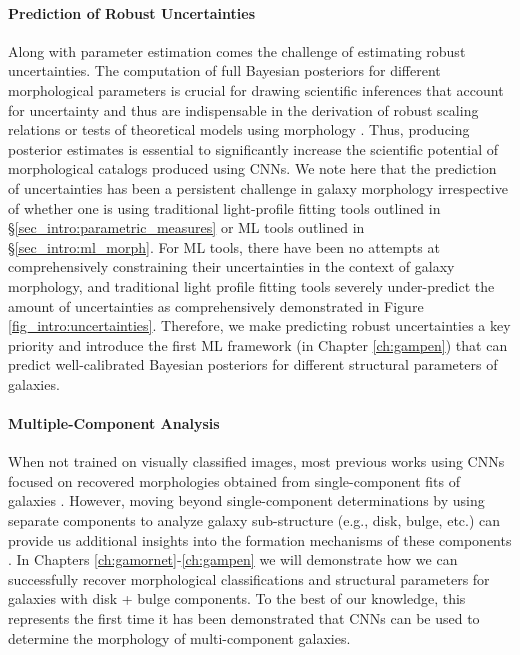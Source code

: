 \paragraph{Prediction of Robust Uncertainties} Along with parameter estimation comes the challenge of estimating robust uncertainties. The computation of full Bayesian posteriors for different morphological parameters is crucial for drawing scientific inferences that account for uncertainty and thus are indispensable in the derivation of robust scaling relations  \citep[e.g.,][]{Bernardi2013TheProfile, vanderWel20143D-HST+CANDELS:3} or tests of theoretical models using morphology \citep[e.g.,][]{Schawinski2014TheGalaxies}. Thus, producing posterior estimates is essential to significantly increase the scientific potential of morphological catalogs produced using CNNs. We note here that the prediction of uncertainties has been a persistent challenge in galaxy morphology irrespective of whether one is using traditional light-profile fitting tools outlined in \S \ref{sec_intro:parametric_measures} or ML tools outlined in \S \ref{sec_intro:ml_morph}. For ML tools, there have been no attempts at comprehensively constraining their uncertainties in the context of galaxy morphology, and traditional light profile fitting tools severely under-predict the amount of uncertainties as comprehensively demonstrated in Figure \ref{fig_intro:uncertainties}. Therefore, we make predicting robust uncertainties a key priority and introduce the first ML framework (in Chapter \ref{ch:gampen}) that can predict well-calibrated Bayesian posteriors for different structural parameters of galaxies. 

\paragraph{Multiple-Component Analysis} When not trained on visually classified images, most previous works using CNNs focused on recovered morphologies obtained from single-component \sersic{} fits of galaxies \citep[e.g.,][]{Tuccillo2018DeepFitting}. However, moving beyond single-component determinations by using separate components to analyze galaxy sub-structure (e.g., disk, bulge, etc.) can provide us additional insights into the formation mechanisms of these components \citep[e.g.,][]{kormendy_1979,kormendy_2004, genzel_2008, sellwood_2014}. In Chapters \ref{ch:gamornet}-\ref{ch:gampen} we will demonstrate how we can successfully recover morphological classifications and structural parameters for galaxies with disk + bulge components. To the best of our knowledge, this represents the first time it has been demonstrated that CNNs can be used to determine the morphology of multi-component galaxies.

